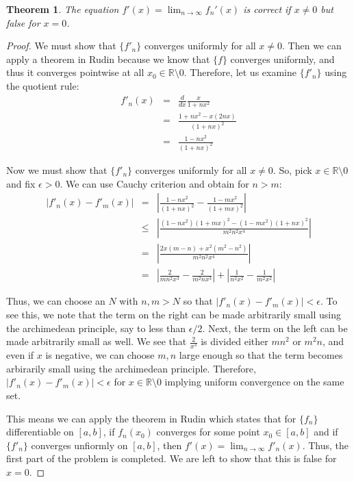 \documentclass[psamsfonts]{amsart}
\newtheorem{thm}{Theorem}[section]
\theoremstyle{definition}
\theoremstyle{remark}
\numberwithin{equation}{section}
\begin{document}
\begin{thm}
The equation $f'(x) = \lim_{n \to \infty} f_n' (x)$ is correct if $x \neq 0$ but false for $x = 0$. 
\end{thm}

\begin{proof}
We must show that $\{ f'_n \}$ converges uniformly for all $x \neq 0$. Then we can apply a theorem in Rudin because we know that $\{ f \}$ converges uniformly, and thus it converges pointwise at all $x_0 \in \mathbb{R} \setminus 0$. Therefore, let us examine $\{ f'_n \}$ using the quotient rule:
\begin{eqnarray}
f'_n(x) &=& \frac{d}{dx} \frac{x}{1+nx^2} \\
&=& \frac{1 + nx^2 - x (2nx)}{(1+nx)^2} \\
&=& \frac{1-nx^2}{(1+nx)^2}
\end{eqnarray}

Now we must show that $\{ f'_n \}$ converges uniformly for all $x \neq 0$. So, pick $x \in \mathbb{R} \setminus 0$ and fix $\epsilon > 0$. We can use Cauchy criterion and obtain for $n > m$:
\begin{eqnarray}
|f'_n(x) - f'_m(x)| &=& \left| \frac{1 - nx^2}{(1+nx)^2} - \frac{1-mx^2}{(1+mx)^2} \right| \\
&\leq& \left| \frac{(1-nx^2)(1+mx)^2 - (1-mx^2) (1+nx)^2}{m^2 n^2 x^4} \right| \\
&=& \left| \frac{2x(m-n) + x^2 (m^2 - n^2)}{m^2 n^2 x^4} \right| \\
&=& \left| \frac{2}{mn^2 x^3} - \frac{2}{m^2 n x^3}\right|  + \left| \frac{1}{n^2 x^2} - \frac{1}{m^2 x^2} \right|
\end{eqnarray}

Thus, we can choose an $N$ with $n,m > N$ so that $|f'_n(x) - f'_m(x)| < \epsilon$. To see this, we note that the term on the right can be made arbitrarily small using the archimedean principle, say to less than $\epsilon/2$. Next, the term on the left can be made arbitrarily small as well. We see that $\frac{2}{x^3}$ is divided either $m n^2$ or $m^2 n$, and even if $x$ is negative, we can choose $m,n$ large enough so that the term becomes arbirarily small using the archimedean principle. Therefore, $|f'_n(x) - f'_m(x)| < \epsilon$ for $x \in \mathbb{R} \setminus 0$ implying uniform convergence on the same set. 

This means we can apply the theorem in Rudin which states that for $\{ f_n \}$ differentiable on $[a,b]$, if $f_n(x_0)$ converges for some point $x_0 \in [a,b]$ and if $\{ f'_n \}$ converges unfiormly on $[a,b]$, then $f'(x) = \lim_{n \to \infty} f'_n(x)$. Thus, the first part of the problem is completed. We are left to show that this is false for $x=0$.


\end{proof}
\end{document}
